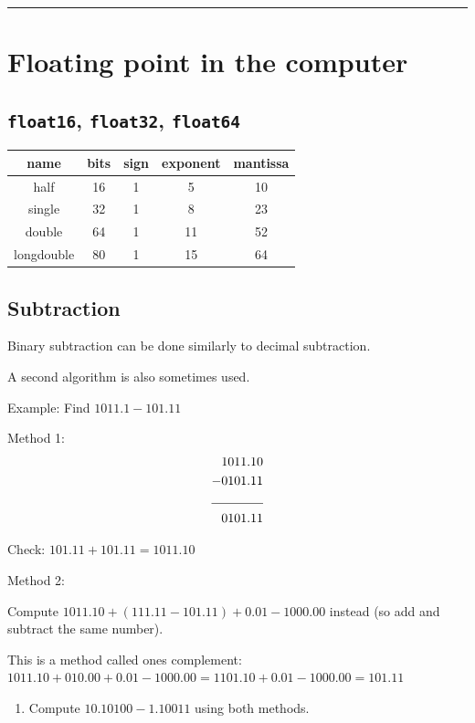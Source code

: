 \documentclass[12pt,letterpaper,noanswers]{exam}
\begin{document}
\vspace{0.2cm}
\hrule
\vspace{0.2cm}


\section{Floating point in the computer}
\subsection{\texttt{float16}, \texttt{float32}, \texttt{float64}}

\begin{tabular}{ c | c | c | c| c}
name &bits & sign & exponent & mantissa\\
\hline
half &16 & 1 & 5 & 10 \\
single& 32 & 1 & 8 & 23 \\
double & 64 & 1 & 11 & 52 \\
longdouble& 80 & 1 & 15 & 64 \\
\end{tabular}



\subsection{Subtraction}

Binary subtraction can be done similarly to decimal subtraction.

A second algorithm is also sometimes used.

Example:
Find $1011.1 - 101.11$

Method 1:
\begin{align*}
&1011.10 \\
- & 0101.11 \\
\cline{1-2}
& 0101.11
\end{align*}

Check: $101.11 + 101.11 = 1011.10$

Method 2:

Compute $1011.10 + (111.11-101.11) + 0.01 - 1000.00$ instead (so add and subtract the same number).

This is a method called ones complement: $1011.10 + 010.00 + 0.01 - 1000.00 = 1101.10 + 0.01 - 1000.00 = 101.11$

\begin{enumerate}
    \item Compute $10.10100 - 1.10011$ using both methods.
\end{enumerate}
\end{document}

